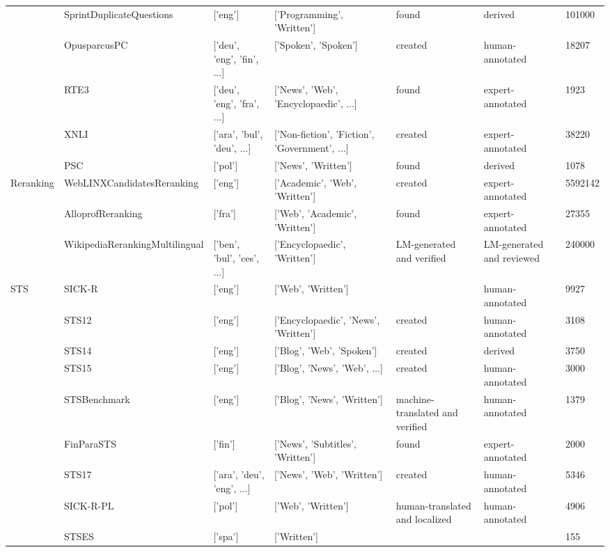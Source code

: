 \begin{table*}
{\begin{tabular}{lllllll}
     & SprintDuplicateQuestions \cite{shah-etal-2018-adversarial} & ['eng'] & ['Programming', 'Written'] & found & derived & 101000 \\
     & OpusparcusPC \cite{creutz2018open} & ['deu', 'eng', 'fin', ...] & ['Spoken', 'Spoken'] & created & human-annotated & 18207 \\
     & RTE3 \cite{giampiccolo-etal-2007-third} & ['deu', 'eng', 'fra', ...] & ['News', 'Web', 'Encyclopaedic', ...] & found & expert-annotated & 1923 \\
     & XNLI \cite{conneau2018xnli} & ['ara', 'bul', 'deu', ...] & ['Non-fiction', 'Fiction', 'Government', ...] & created & expert-annotated & 38220 \\
     & PSC \cite{ogrodniczuk-kopec-2014-polish} & ['pol'] & ['News', 'Written'] & found & derived & 1078 \\
    \cline{1-7}
    \multirow[t]{3}{*}{Reranking} & WebLINXCandidatesReranking \cite{lù2024weblinx} & ['eng'] & ['Academic', 'Web', 'Written'] & created & expert-annotated & 5592142 \\
     & AlloprofReranking \cite{lef23} & ['fra'] & ['Web', 'Academic', 'Written'] & found & expert-annotated & 27355 \\
     & WikipediaRerankingMultilingual \cite{wikidump} & ['ben', 'bul', 'ces', ...] & ['Encyclopaedic', 'Written'] & LM-generated and verified & LM-generated and reviewed & 240000 \\
    \cline{1-7}
    \multirow[t]{9}{*}{STS} & SICK-R \cite{marelli-etal-2014-sick} & ['eng'] & ['Web', 'Written'] & & human-annotated & 9927 \\
     & STS12 \cite{10.5555/2387636.2387697} & ['eng'] & ['Encyclopaedic', 'News', 'Written'] & created & human-annotated & 3108 \\
     & STS14 \cite{bandhakavi-etal-2014-generating} & ['eng'] & ['Blog', 'Web', 'Spoken'] & created & derived & 3750 \\
     & STS15 \cite{bicici-2015-rtm} & ['eng'] & ['Blog', 'News', 'Web', ...] & created & human-annotated & 3000 \\
     & STSBenchmark \cite{huggingface:dataset:stsb_multi_mt} & ['eng'] & ['Blog', 'News', 'Written'] & machine-translated and verified & human-annotated & 1379 \\
     & FinParaSTS \cite{kanerva-etal-2021-finnish} & ['fin'] & ['News', 'Subtitles', 'Written'] & found & expert-annotated & 2000 \\
     & STS17 \cite{cer-etal-2017-semeval} & ['ara', 'deu', 'eng', ...] & ['News', 'Web', 'Written'] & created & human-annotated & 5346 \\
     & SICK-R-PL \cite{dadas-etal-2020-evaluation} & ['pol'] & ['Web', 'Written'] & human-translated and localized & human-annotated & 4906 \\
     & STSES \cite{agirre2015semeval} & ['spa'] & ['Written'] & & & 155 \\
    \cline{1-7}
    \bottomrule
    \end{tabular}
    
}
\end{table*}
